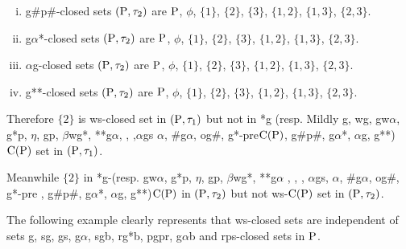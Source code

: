 \begin{exm}
\begin{enumerate}[(i)]
\item g\#p\#-closed sets $(\mathrm{P}, \tau_{2})$ are $\mathrm{P}$, $\phi$, $\{1\}$, $\{2\}$, $\{3\}$, $\{1, 2\}$, $\{1, 3\}$, $\{2, 3\}$.
\item g$\alpha$*-closed sets $(\mathrm{P}, \tau_{2})$ are $\mathrm{P}$, $\phi$, $\{1\}$, $\{2\}$, $\{3\}$, $\{1, 2\}$, $\{1, 3\}$, $\{2, 3\}$.
\item $\alpha$g-closed sets $(\mathrm{P}, \tau_{2})$ are $\mathrm{P}$, $\phi$, $\{1\}$, $\{2\}$, $\{3\}$, $\{1, 2\}$, $\{1, 3\}$, $\{2, 3\}$.
\item g{*}{*}-closed sets $(\mathrm{P}, \tau_{2})$ are $\mathrm{P}$, $\phi$, $\{1\}$, $\{2\}$, $\{3\}$, $\{1, 2\}$, $\{1, 3\}$, $\{2, 3\}$.
\end{enumerate}

Therefore $\{2\}$ is ws-closed set in $(\mathrm{P}, \tau_{1})$ but not in *g (resp. Mildly g, wg, gw$\alpha$, g*p, $\eta$, gp, $\beta$wg*, {*}{*}g$\alpha$, , ,$\alpha$gs $\alpha$, \#g$\alpha$, og\#, g*-pre$\mathrm{C}(\mathrm{P})$, g\#p\#, g$\alpha$*, $\alpha$g, g{*}{*})$\mathrm{C}(\mathrm{P})$ set in $(\mathrm{P},\tau_{1})$.

Meanwhile $\{2\}$ in *g-(resp. gw$\alpha$, g*p, $\eta$, gp, $\beta$wg*, {*}{*}g$\alpha$ , , , $\alpha$gs, $\alpha$, \#g$\alpha$, og\#, g*-pre , g\#p\#, g$\alpha$*, $\alpha$g, g{*}{*})$\mathrm{C}(\mathrm{P})$ in $(\mathrm{P}, \tau_{2})$ but not ws-$\mathrm{C}(\mathrm{P})$ set in $(\mathrm{P}, \tau_{2})$.
\end{exm}

\begin{rem}\label{rem2.2.18}
The following example clearly represents that ws-closed sets are independent of sets g, sg, gs, g$\alpha$, sgb, rg*b, pgpr, g$\alpha$b and rps-closed sets in $\mathrm{P}$.
\end{rem}

